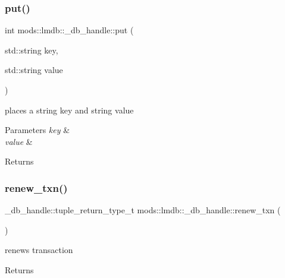 \subsubsection{\texorpdfstring{put()}{put()}\hspace{0.1cm}{\footnotesize\ttfamily [2/2]}}
{\footnotesize\ttfamily int mods\+::lmdb\+::\+\_\+db\+\_\+handle\+::put (\begin{DoxyParamCaption}\item[{std\+::string}]{key,  }\item[{std\+::string}]{value }\end{DoxyParamCaption})}



places a string key and string value 


\begin{DoxyParams}{Parameters}
{\em key} & \\
\hline
{\em value} & \\
\hline
\end{DoxyParams}
\begin{DoxyReturn}{Returns}

\end{DoxyReturn}
\mbox{\label{structmods_1_1lmdb_1_1__db__handle_a93d43cfa607ecd743bcba325e658e9c6}} 
\subsubsection{\texorpdfstring{renew\+\_\+txn()}{renew\_txn()}}
{\footnotesize\ttfamily \+\_\+db\+\_\+handle\+::tuple\+\_\+return\+\_\+type\+\_\+t mods\+::lmdb\+::\+\_\+db\+\_\+handle\+::renew\+\_\+txn (\begin{DoxyParamCaption}{ }\end{DoxyParamCaption})}



renews transaction 

\begin{DoxyReturn}{Returns}

\end{DoxyReturn}
\mbox{\label{structmods_1_1lmdb_1_1__db__handle_a89d952ebde51897bf5677a570cb6ec42}} 
